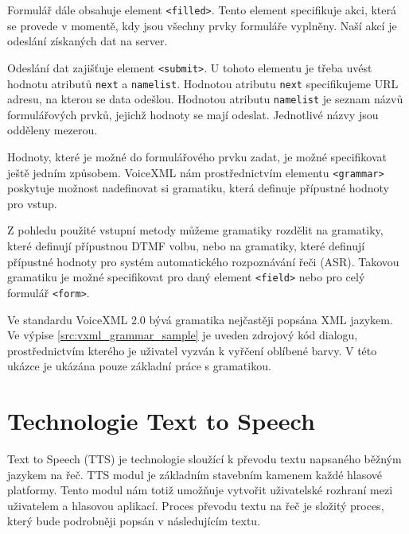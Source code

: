 \documentclass[ing,male,java,dept460,twoside]{diploma}						%
\begin{document}
Formulář dále obsahuje element \texttt{<filled>}. Tento element specifikuje akci, která se provede v momentě, kdy jsou všechny prvky formuláře vyplněny. Naší akcí je odeslání získaných dat na server.

Odeslání dat zajišťuje element \texttt{<submit>}. U tohoto elementu je třeba uvést hodnotu atributů \texttt{next} a \texttt{namelist}. Hodnotou atributu \texttt{next} specifikujeme URL adresu, na kterou se data odešlou. Hodnotou atributu \texttt{namelist} je seznam názvů formulářových prvků, jejichž hodnoty se mají odeslat. Jednotlivé názvy jsou odděleny mezerou.



Hodnoty, které je možné do formulářového prvku zadat, je možné specifikovat ještě jedním způsobem. VoiceXML nám prostřednictvím elementu \texttt{<grammar>} poskytuje možnost nadefinovat si gramatiku, která definuje přípustné hodnoty pro vstup.

Z pohledu použité vstupní metody můžeme gramatiky rozdělit na gramatiky, které definují přípustnou DTMF volbu, nebo na gramatiky, které definují přípustné hodnoty pro systém automatického rozpoznávání řeči (ASR). Takovou gramatiku je možné specifikovat pro daný element \texttt{<field>} nebo pro celý formulář \texttt{<form>}.

Ve standardu VoiceXML 2.0 bývá gramatika nejčastěji popsána XML jazykem. Ve výpise \ref{src:vxml_grammar_sample} je uveden zdrojový kód dialogu, prostřednictvím kterého je uživatel vyzván k vyřčení oblíbené barvy. V této ukázce je ukázána pouze základní práce s gramatikou.



\section{Technologie Text to Speech}
\label{sec:TTS}
Text to Speech (TTS) je technologie sloužící k převodu textu napsaného běžným jazykem na řeč. TTS modul je základním stavebním kamenem každé hlasové platformy. Tento modul nám totiž umožňuje vytvořit uživatelské rozhraní mezi uživatelem a hlasovou aplikací. Proces převodu textu na řeč je složitý proces, který bude podrobněji popsán v následujícím textu.
\end{document}
